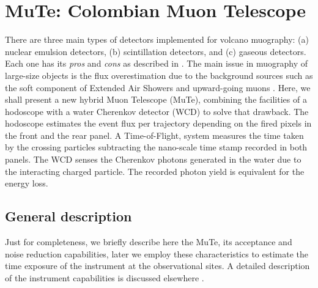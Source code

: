 \documentclass[letterpaper,10pt,titlepage,linenumber]{article}
\begin{document}
\section{MuTe: Colombian Muon Telescope}
\label{subsec:BriefMuonTelescope}
There are three main types of detectors implemented for volcano muography: (a) nuclear emulsion detectors, (b) scintillation detectors, and (c) gaseous detectors. Each one has its \textit{pros} and \textit{cons} as described in \cite{TanakaOlah2019, Tanaka2016}. The main issue in muography of large-size objects is the flux overestimation due to the background sources such as the soft component of Extended Air Showers \cite{OlahVarga2017, NishiyamaMiyamotoNaganawa2014} and upward-going muons \cite{JourdeEtal2013}. Here, we shall present a new hybrid Muon Telescope (MuTe), combining the facilities of a hodoscope with a water Cherenkov detector (WCD) to solve that drawback. The hodoscope estimates the event flux per trajectory depending on the fired pixels in the front and the rear panel. A Time-of-Flight, system measures the time taken by the crossing particles subtracting the nano-scale time stamp recorded in both panels. The WCD senses the Cherenkov photons generated in the water due to the interacting charged particle. The recorded photon yield is equivalent for the energy loss.


\subsection{General description}
Just for completeness, we briefly describe here the MuTe, its acceptance and noise reduction capabilities, later we employ these characteristics to estimate the time exposure of the instrument at the observational sites. A detailed description of the instrument capabilities is discussed elsewhere \cite{VasquezEtal2019, PenarodriguezEtal2020prep}.
\end{document}
